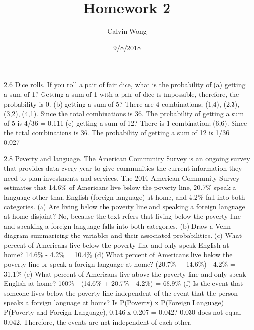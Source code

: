 \documentclass[]{article}
\title{Homework 2}
\author{Calvin Wong}
\date{9/8/2018}
\begin{document}
\maketitle

2.6 Dice rolls. If you roll a pair of fair dice, what is the probability
of (a) getting a sum of 1? Getting a sum of 1 with a pair of dice is
impossible, therefore, the probability is 0. (b) getting a sum of 5?
There are 4 combinations; (1,4), (2,3), (3,2), (4,1). Since the total
combinations is 36. The probability of getting a sum of 5 is 4/36 =
0.111 (c) getting a sum of 12? There is 1 combination; (6,6). Since the
total combinations is 36. The probability of getting a sum of 12 is 1/36
= 0.027

2.8 Poverty and language. The American Community Survey is an ongoing
survey that provides data every year to give communities the current
information they need to plan investments and services. The 2010
American Community Survey estimates that 14.6\% of Americans live below
the poverty line, 20.7\% speak a language other than English (foreign
language) at home, and 4.2\% fall into both categories. (a) Are living
below the poverty line and speaking a foreign language at home disjoint?
No, because the text refers that living below the poverty line and
speaking a foreign language falls into both categories. (b) Draw a Venn
diagram summarizing the variables and their associated probabilities.
(c) What percent of Americans live below the poverty line and only speak
English at home? 14.6\% - 4.2\% = 10.4\% (d) What percent of Americans
live below the poverty line or speak a foreign language at home? (20.7\%
+ 14.6\%) - 4.2\% = 31.1\% (e) What percent of Americans live above the
poverty line and only speak English at home? 100\% - (14.6\% + 20.7\% -
4.2\%) = 68.9\% (f) Is the event that someone lives below the poverty
line independent of the event that the person speaks a foreign language
at home? Is P(Poverty) x P(Foreign Language) = P(Poverty and Foreign
Language), 0.146 x 0.207 = 0.042? 0.030 does not equal 0.042. Therefore,
the events are not independent of each other.
\end{document}
